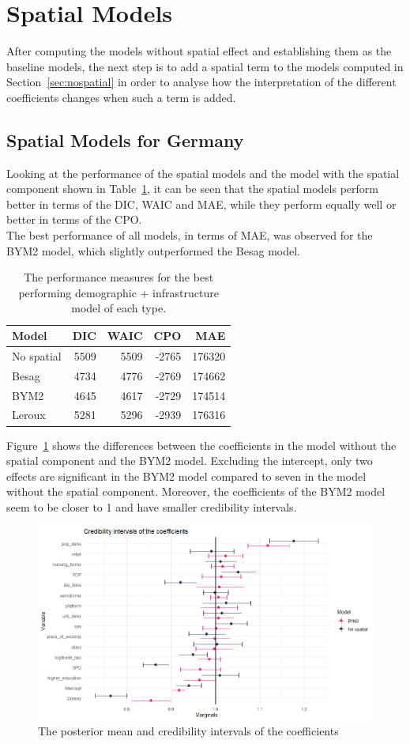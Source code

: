 \section{Spatial Models}\label{ch:spatial}
After computing the models without spatial effect and establishing them as the baseline models, the next step is to add a spatial term to the models computed in Section~\ref{sec:nospatial} in order to analyse how the interpretation of the different coefficients changes when such a term is added.
\subsection{Spatial Models for Germany}
Looking at the performance of the spatial models and the model with the spatial component shown in Table~\ref{allGermany}, it can be seen that the spatial models perform better in terms of the DIC, WAIC and MAE, while they perform equally well or better in terms of the CPO. \\
The best performance of all models, in terms of MAE, was observed for the BYM2 model, which slightly outperformed the Besag model.
\begin{table}[H] 
\caption{The performance measures for the best performing demographic + infrastructure model of each type. \label{allGermany}}
\begin{tabular}{l r r r r}
\toprule
\textbf{Model}	& \textbf{DIC}	& \textbf{WAIC} & \textbf{CPO} & \textbf{MAE}\\
\midrule
No spatial & 5509 & 5509 & -2765 & 176320 \\
Besag&  4734 & 4776 & -2769 & 174662\\
BYM2 & 4645 & 4617 & -2729 & 174514\\
Leroux & 5281 & 5296 & -2939 & 176316 \\
\bottomrule
\end{tabular}
\end{table}
Figure~\ref{intervalGermany} shows the differences between the coefficients in the model without the spatial component and the BYM2 model. Excluding the intercept, only two effects are significant in the BYM2 model compared to seven in the model without the spatial component. Moreover, the coefficients of the BYM2 model seem to be closer to 1 and have smaller credibility intervals.
\begin{figure}[H]
    \centering
    \includegraphics[width = \textwidth]{intervals_germany.png}
    \caption{The posterior mean and credibility intervals of the coefficients}
    \label{intervalGermany}
\end{figure}
